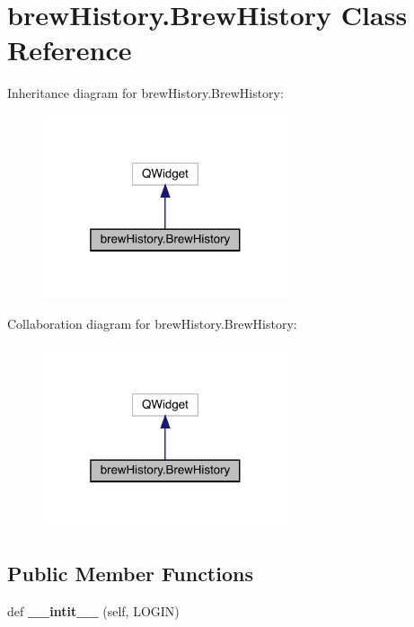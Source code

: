 \hypertarget{classbrew_history_1_1_brew_history}{}\section{brew\+History.\+Brew\+History Class Reference}
\label{classbrew_history_1_1_brew_history}


Inheritance diagram for brew\+History.\+Brew\+History\+:\nopagebreak
\begin{figure}[H]
\begin{center}
\leavevmode
\includegraphics[width=205pt]{classbrew_history_1_1_brew_history__inherit__graph}
\end{center}
\end{figure}


Collaboration diagram for brew\+History.\+Brew\+History\+:\nopagebreak
\begin{figure}[H]
\begin{center}
\leavevmode
\includegraphics[width=205pt]{classbrew_history_1_1_brew_history__coll__graph}
\end{center}
\end{figure}
\subsection*{Public Member Functions}
\begin{DoxyCompactItemize}
\item 
\mbox{\label{classbrew_history_1_1_brew_history_a4ca18f84a2d3759293168401c4e81168}} 
def {\bfseries \+\_\+\+\_\+intit\+\_\+\+\_\+} (self, L\+O\+G\+IN)
\end{DoxyCompactItemize}
